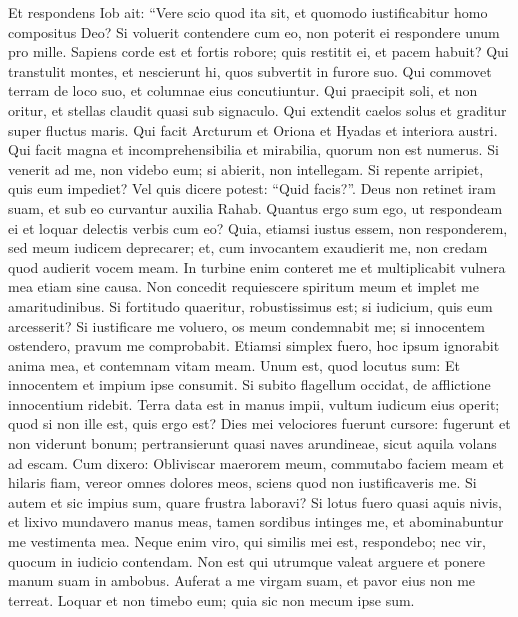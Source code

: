\begin{biblechapter}  
\verse Et respondens Iob ait: 
\verse “Vere scio quod ita sit, et quomodo iustificabitur homo compositus Deo? 
\verse Si voluerit contendere cum eo, non poterit ei respondere unum pro mille. 
\verse Sapiens corde est et fortis robore; quis restitit ei, et pacem habuit? 
\verse Qui transtulit montes, et nescierunt hi, quos subvertit in furore suo. 
\verse Qui commovet terram de loco suo, et columnae eius concutiuntur. 
\verse Qui praecipit soli, et non oritur, et stellas claudit quasi sub signaculo. 
\verse Qui extendit caelos solus et graditur super fluctus maris. 
\verse Qui facit Arcturum et Oriona et Hyadas et interiora austri. 
\verse Qui facit magna et incomprehensibilia et mirabilia, quorum non est numerus. 
\verse Si venerit ad me, non videbo eum; si abierit, non intellegam. 
\verse Si repente arripiet, quis eum impediet? Vel quis dicere potest: “Quid facis?”. 
\verse Deus non retinet iram suam, et sub eo curvantur auxilia Rahab. 
\verse Quantus ergo sum ego, ut respondeam ei et loquar delectis verbis cum eo? 
\verse Quia, etiamsi iustus essem, non responderem, sed meum iudicem deprecarer; 
\verse et, cum invocantem exaudierit me, non credam quod audierit vocem meam. 
\verse In turbine enim conteret me et multiplicabit vulnera mea etiam sine causa. 
\verse Non concedit requiescere spiritum meum et implet me amaritudinibus. 
\verse Si fortitudo quaeritur, robustissimus est; si iudicium, quis eum arcesserit? 
\verse Si iustificare me voluero, os meum condemnabit me; si innocentem ostendero, pravum me comprobabit. 
\verse Etiamsi simplex fuero, hoc ipsum ignorabit anima mea, et contemnam vitam meam. 
\verse Unum est, quod locutus sum: Et innocentem et impium ipse consumit. 
\verse Si subito flagellum occidat, de afflictione innocentium ridebit. 
\verse Terra data est in manus impii, vultum iudicum eius operit; quod si non ille est, quis ergo est? 
\verse Dies mei velociores fuerunt cursore: fugerunt et non viderunt bonum; 
\verse pertransierunt quasi naves arundineae, sicut aquila volans ad escam. 
\verse Cum dixero: Obliviscar maerorem meum, commutabo faciem meam et hilaris fiam, 
\verse vereor omnes dolores meos, sciens quod non iustificaveris me. 
\verse Si autem et sic impius sum, quare frustra laboravi? 
\verse Si lotus fuero quasi aquis nivis, et lixivo mundavero manus meas, 
\verse tamen sordibus intinges me, et abominabuntur me vestimenta mea. 
\verse Neque enim viro, qui similis mei est, respondebo; nec vir, quocum in iudicio contendam. 
\verse Non est qui utrumque valeat arguere et ponere manum suam in ambobus. 
\verse Auferat a me virgam suam, et pavor eius non me terreat. 
\verse Loquar et non timebo eum; quia sic non mecum ipse sum. 
\end{biblechapter}

